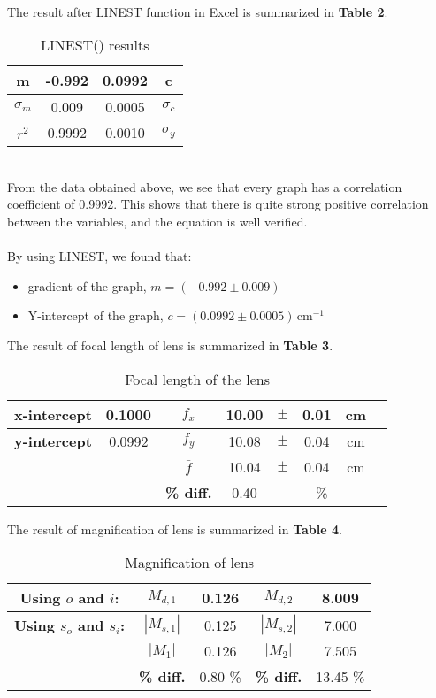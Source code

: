 \documentclass[a4paper,11pt]{article}
\begin{document}
\\
The result after LINEST function in Excel is summarized in \textbf{Table 2}.
\begin{table}[h!]
\centering
\caption{LINEST() results}
\begin{tabular}{|c|c|c|c|}
\hline
m & -0.992 & 0.0992 & c  \\ 
\hline
\textbf{$\sigma_m$} & 0.009 & 0.0005 &\textbf{$\sigma_c$}\\ 
\hline
\textbf{$r^2$} & 0.9992 & 0.0010 &\textbf{$\sigma_y$}\\ 
\hline
\end{tabular}
\end{table}
\\
From the data obtained above, we see that every graph has a correlation coefficient of 0.9992. This shows that there is quite strong positive correlation between the variables, and the equation is well verified. \\
\\
By using LINEST, we found that:
\begin{itemize}
  \item[] gradient of the graph, $m = (-0.992 \pm 0.009)$
  \item[] Y-intercept of the graph, $c = (0.0992 \pm 0.0005)\, \text{cm}^{-1}$\\
\end{itemize}
The result of focal length of lens is summarized in \textbf{Table 3}.
\begin{table}[ht]
\centering
\renewcommand{\arraystretch}{1.1}
\caption{Focal length of the lens}
\begin{tabular}{|c|c|c|c|c|c|c|c|}
\hline
\textbf{x-intercept} & 0.1000 &\textbf{\( f_x \)} & 10.00 & \(\pm\) &0.01 & cm \\
\hline
\textbf{y-intercept} & 0.0992 &\textbf{\( f_y \)} & 10.08 & \(\pm\) &0.04 & cm \\
\hline
\multicolumn{1}{c}{}& \multicolumn{1}{c|}{}& \( \bar{f} \) & 10.04 & \(\pm\) &0.04  & cm \\
\cline{3-7}
\multicolumn{1}{c}{}& \multicolumn{1}{c|}{}&\textbf{\% diff.} &0.40 &\multicolumn{3}{c|}{ \%} \\
\cline{3-7}
\end{tabular}
\label{your-label}
\end{table}
\newpage
\noindent The result of magnification of lens is summarized in \textbf{Table 4}.
\begin{table}[h!]
\centering
\caption{Magnification of lens}
\begin{tabular}{|c|c|c|c|c|}
\hline
\textbf{Using \( o \) and \( i \):} & \( M_{d,1} \)& 0.126 & \( M_{d,2} \)& 8.009 \\
\hline 
\textbf{Using \( s_o \) and \( s_i \):} & \( |M_{s,1}| \) & 0.125 & \( |M_{s,2}| \) & 7.000 \\
\hline
\multicolumn{1}{c|}{}&  \textbf{\( |M_1| \)} & 0.126 & \textbf{\( |M_2| \)} &7.505 \\
\cline{2-5}
\multicolumn{1}{c|}{}&  \textbf{\% diff.} & 0.80 \% & \textbf{\% diff.} &13.45 \% \\
\cline{2-5}
\end{tabular}
\label{tab:my_label}
\end{table}
\end{document}
